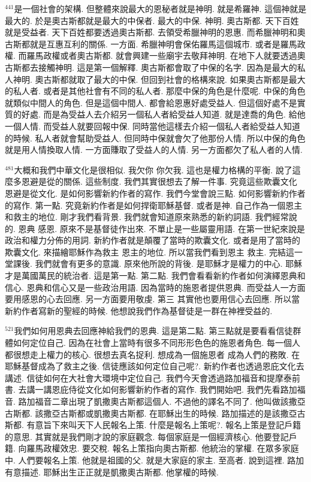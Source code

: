 \documentclass{book}
\begin{document}
$^{441}$是一個社會的架構.
但整體來說最大的恩秘者就是神明.
就是希羅神.
這個神就是最大的.
於是奧古斯都就是最大的中保者.
最大的中保.
神明.
奧古斯都.
天下百姓就是受益者.
天下百姓都要透過奧古斯都.
去領受希臘神明的恩惠.
而希臘神明和奧古斯都就是互惠互利的關係.
一方面.
希臘神明會保佑羅馬這個城市.
或者是羅馬政權.
而羅馬政權或者奧古斯都.
就會興建一些廟宇去敬拜神明.
在地下人就要透過奧古斯都去接觸神明.
這是第一個解釋.
奧古斯都會取了中保的名字.
因為是最大的私人神明.
奧古斯都就取了最大的中保.
但回到社會的格構來說.
如果奧古斯都是最大的私人者.
或者是其他社會有不同的私人者.
那麼中保的角色是什麼呢.
中保的角色就類似中間人的角色.
但是這個中間人.
都會給恩惠好處受益人.
但這個好處不是實質的好處.
而是為受益人去介紹另一個私人者給受益人知道.
就是達喬的角色.
給他一個人情.
而受益人就要回報中保.
同時當他這樣去介紹一個私人者給受益人知道的時候.
私人者就會幫助受益人.
但同時中保就會欠了他那份人情.
所以中保的角色就是用人情換取人情.
一方面賺取了受益人的人情.
另一方面都欠了私人者的人情.

$^{481}$大概和我們中華文化是很相似.
我欠你 你欠我.
這也是權力格構的平衡.
說了這麼多恩避是從的關係.
這些制度.
我們其實很想去了解一件事.
究竟這些欺囊文化 恩避是從文化.
是如何影響新約作者的寫作.
我們今堂會說三點.
如何影響新約作者的寫作.
第一點.
究竟新約作者是如何捍衛耶穌基督.
或者是神.
自己作為一個恩主和救主的地位.
剛才我們看背景.
我們就會知道原來熟悉的新約詞語.
我們經常說的.
恩典 感恩.
原來不是基督徒作出來.
不單止是一些屬靈用語.
在第一世紀來說是政治和權力分佈的用詞.
新約作者就是顛覆了當時的欺囊文化.
或者是用了當時的欺囊文化.
來描繪耶穌作為救主 恩主的地位.
所以當我們看到恩主 救主.
完結這一堂課後.
我們就會有更多的意識.
原來他所說的背後.
是耶穌才是權力的中心.
耶穌才是萬國萬民的統治者.
這是第一點.
第二點.
我們會看看新約作者如何演繹恩典和信心.
恩典和信心又是一些政治用語.
因為當時的施恩者提供恩典.
而受益人一方面要用感恩的心去回應.
另一方面要用敬虔.
第三 其實他也要用信心去回應.
所以當新約作者寫新的聖經的時候.
他想說我們作為基督徒是一群在神裡受益的.

$^{521}$我們如何用恩典去回應神給我們的恩典.
這是第二點.
第三點就是要看看信徒群體如何定位自己.
因為在社會上當時有很多不同形形色色的施恩者角色.
每一個人都很想走上權力的核心.
很想去真名捉利.
想成為一個施恩者 成為人們的務敗.
在耶穌基督成為了救主之後.
信徒應該如何定位自己呢?.
新約作者也透過恩庇文化去講述.
信徒如何在大社會大環境中定位自己.
我們今天會透過路加福音和提摩泰前書.
去講一講恩庇侍從文化如何影響新約作者的寫作.
我們開始吧.
我們先看路加福音.
路加福音二章出現了凱撒奧古斯都這個人.
不過他的譯名不同了.
他叫做該撒亞古斯都.
該撒亞古斯都或凱撒奧古斯都.
在耶穌出生的時候.
路加描述的是該撒亞古斯都.
有意旨下來叫天下人民報名上策.
什麼是報名上策呢?.
報名上策是登記戶籍的意思.
其實就是我們剛才說的家庭觀念.
每個家庭是一個經濟核心.
他要登記戶籍.
向羅馬政權效忠.
要交稅.
報名上策指向奧古斯都.
他統治的掌權.
在眾多家庭中.
人們要報名上策.
他就是祖國的父.
就是大家庭的家主.
至高者.
說到這裡.
路加有意描述.
耶穌出生正正就是凱撒奧古斯都.
他掌權的時候.
\end{document}

